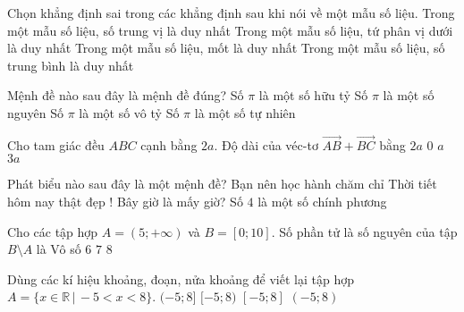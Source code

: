 \begin{ex}%
	Chọn khẳng định sai trong các khẳng định sau khi nói về một mẫu số liệu.
	\choice
	{Trong một mẫu số liệu, số trung vị là duy nhất}
	{Trong một mẫu số liệu, tứ phân vị dưới là duy nhất}
	{\True Trong một mẫu số liệu, mốt là duy nhất}
	{Trong một mẫu số liệu, số trung bình là duy nhất}
\end{ex}
\begin{ex}%
	Mệnh đề nào sau đây là mệnh đề đúng?
	\choice
	{Số	$\pi$	là một số hữu tỷ}
	{Số	$\pi$ là một số nguyên}
	{\True Số	$\pi$ là một số vô tỷ}
	{Số	$\pi$ là một số tự nhiên}
\end{ex}
\begin{ex}%
	Cho tam giác đều $ABC$ cạnh bằng $2a$. Độ dài của véc-tơ $\overrightarrow{AB} + \overrightarrow{BC}$ bằng
	\choice
	{\True $2a$}
	{$0$}
	{$a$}
	{$3a$}
\end{ex}
\begin{ex}%
	Phát biểu nào sau đây là một mệnh đề?
	\choice
	{Bạn nên học hành chăm chỉ}
	{Thời tiết hôm nay thật đẹp !}
	{Bây giờ là mấy giờ?}
	{\True Số $4$ là một số chính phương}
\end{ex}
\begin{ex}%
	Cho các tập hợp $A=(5;+\infty)$ và $B=[0;10]$. Số phần tử là số nguyên của tập $B\setminus A$ là
	\choice
	{Vô số}
	{\True $6$}
	{$7$}
	{$8$}
\end{ex}
\begin{ex}%
	Dùng các kí hiệu khoảng, đoạn, nửa khoảng để viết lại tập hợp $A=\{x \in\mathbb{R}\,|\, -5 <x < 8\}$.
	\choice
	{$(-5;8]$}
	{$[-5;8)$}
	{$[-5;8]$}
	{\True $(-5;8)$}
\end{ex}
